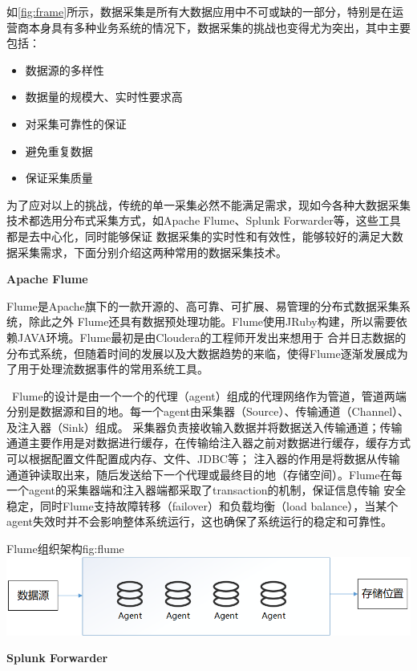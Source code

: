 \documentclass{HustGraduPaper}
\begin{document}
    如\autoref{fig:frame}所示，数据采集是所有大数据应用中不可或缺的一部分，特别是在运营商本身具有多种业务系统的情况下，数据采集的挑战也变得尤为突出，其中主要包括：
    \begin{itemize}
		\item 数据源的多样性
        \item 数据量的规模大、实时性要求高
        \item 对采集可靠性的保证
        \item 避免重复数据
        \item 保证采集质量
    \end{itemize}
    为了应对以上的挑战，传统的单一采集必然不能满足需求，现如今各种大数据采集技术都选用分布式采集方式，如Apache Flume、Splunk Forwarder等，这些工具都是去中心化，同时能够保证
    数据采集的实时性和有效性，能够较好的满足大数据采集需求，下面分别介绍这两种常用的数据采集技术。

    {\songti \bfseries Apache Flume}

    Flume是Apache旗下的一款开源的、高可靠、可扩展、易管理的分布式数据采集系统，除此之外 Flume还具有数据预处理功能。Flume使用JRuby构建，所以需要依赖JAVA环境。Flume最初是由Cloudera的工程师开发出来想用于
    合并日志数据的分布式系统，但随着时间的发展以及大数据趋势的来临，使得Flume逐渐发展成为了用于处理流数据事件的常用系统工具。%

    \ Flume的设计是由一个一个的代理（agent）组成的代理网络作为管道，管道两端分别是数据源和目的地。每一个agent由采集器（Source）、传输通道（Channel）、及注入器（Sink）组成。
    采集器负责接收输入数据并将数据送入传输通道；传输通道主要作用是对数据进行缓存，在传输给注入器之前对数据进行缓存，缓存方式可以根据配置文件配置成内存、文件、JDBC等；
    注入器的作用是将数据从传输通道钟读取出来，随后发送给下一个代理或最终目的地（存储空间）。Flume在每一个agent的采集器端和注入器端都采取了transaction的机制，保证信息传输
    安全稳定，同时Flume支持故障转移（failover）和负载均衡（load balance），当某个agent失效时并不会影响整体系统运行，这也确保了系统运行的稳定和可靠性。

    \begin{generalfig}{Flume组织架构}{fig:flume}
        \includegraphics[width=\textwidth]{Figures/flume.png}
    \end{generalfig}
    {\songti \bfseries Splunk Forwarder}
    
\end{document}
